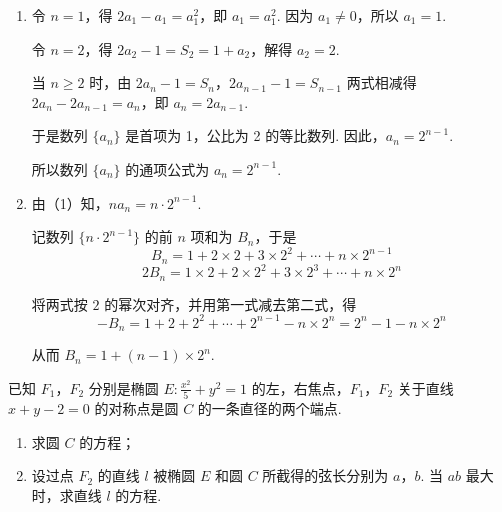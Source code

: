 \begin{solution}
\begin{enumerate}
\item 令 \(n=1\)，得 \(2a_{1}-a_{1}=a_{1}^{2}\)，即 \(a_{1}=a_{1}^{2}\). 因为 \(a_{1}\neq0\)，所以 \(a_{1}=1\).

令 \(n=2\)，得 \(2a_{2}-1=S_{2}=1+a_{2}\)，解得 \(a_{2}=2\).

当 \(n\geqslant2\) 时，由 \(2a_{n}-1=S_{n}\)，\(2a_{n-1}-1=S_{n-1}\) 两式相减得 \(2a_{n}-2a_{n-1}=a_{n}\)，即 \(a_{n}=2a_{n-1}\).

于是数列 \(\{a_{n}\}\) 是首项为 1，公比为 2 的等比数列. 因此，\(a_{n}=2^{n-1}\).

所以数列 \(\{a_{n}\}\) 的通项公式为 \(a_{n}=2^{n-1}\).

\item 由（1）知，\(na_{n}=n\cdot2^{n-1}\).

记数列 \(\{n\cdot2^{n-1}\}\) 的前 \(n\) 项和为 \(B_{n}\)，于是
\[
B_{n}=1+2\times2+3\times2^{2}+\cdots+n\times2^{n-1}
\]
\[
2B_{n}=1\times2+2\times2^{2}+3\times2^{3}+\cdots+n\times2^{n}
\]

将两式按 \(2\) 的幂次对齐，并用第一式减去第二式，得
\[
-B_{n}=1+2+2^{2}+\cdots+2^{n-1}-n\times2^{n}=2^{n}-1-n\times2^{n}
\]

从而 \(B_{n}=1+(n-1)\times2^{n}\).
\end{enumerate}
\end{solution}

\begin{problem}
已知 \(F_{1}\)，\(F_{2}\) 分别是椭圆 \(E: \frac{x^{2}}{5} + y^{2} = 1\) 的左，右焦点，\(F_{1}\)，\(F_{2}\) 关于直线 \(x + y - 2 = 0\) 的对称点是圆 \(C\) 的一条直径的两个端点.
\begin{enumerate}
\item 求圆 \(C\) 的方程；
\item 设过点 \(F_{2}\) 的直线 \(l\) 被椭圆 \(E\) 和圆 \(C\) 所截得的弦长分别为 \(a\)，\(b\). 当 \(ab\) 最大时，求直线 \(l\) 的方程.
\end{enumerate}
\end{problem}


